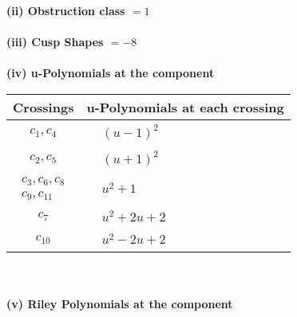 \documentclass[1p]{elsarticle_modified}
\theoremstyle{definition}
\begin{document}
\flushleft \textbf{(ii) Obstruction class $= 1$}\\~\\
\flushleft \textbf{(iii) Cusp Shapes $= -8$}\\~\\
\newpage\renewcommand{\arraystretch}{1}
\flushleft \textbf{(iv) u-Polynomials at the component}\newline \\
\begin{tabular}{m{50pt}|m{274pt}}
Crossings & \hspace{64pt}u-Polynomials at each crossing \\
\hline $$\begin{aligned}c_{1},c_{4}\end{aligned}$$&$\begin{aligned}
&(u-1)^2
\end{aligned}$\\
\hline $$\begin{aligned}c_{2},c_{5}\end{aligned}$$&$\begin{aligned}
&(u+1)^2
\end{aligned}$\\
\hline $$\begin{aligned}c_{3},c_{6},c_{8}\\c_{9},c_{11}\end{aligned}$$&$\begin{aligned}
&u^2+1
\end{aligned}$\\
\hline $$\begin{aligned}c_{7}\end{aligned}$$&$\begin{aligned}
&u^2+2 u+2
\end{aligned}$\\
\hline $$\begin{aligned}c_{10}\end{aligned}$$&$\begin{aligned}
&u^2-2 u+2
\end{aligned}$\\
\hline
\end{tabular}\\~\\
\newpage\renewcommand{\arraystretch}{1}
\flushleft \textbf{(v) Riley Polynomials at the component}\newline \\
\end{document}
